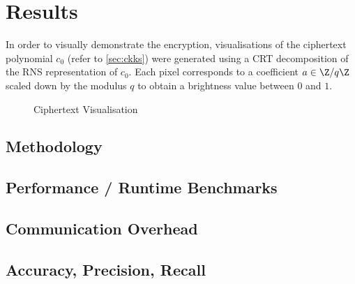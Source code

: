 \chapter{Results}
In order to visually demonstrate the encryption, visualisations of the ciphertext polynomial $c_0$ (refer to \autoref{sec:ckks}) were generated using a CRT decomposition of the RNS representation of $c_0$.
Each pixel corresponds to a coefficient $a \in \Z / q\Z$ scaled down by the modulus $q$ to obtain a brightness value between $0$ and $1$.

\begin{figure}[H]
  \centering
  \pgfplotsset{/pgfplots/group/.cd,vertical sep=0.3cm,horizontal sep=0.3cm}
  
  \caption{Ciphertext Visualisation}
\end{figure}

\section{Methodology}
\section{Performance / Runtime Benchmarks}
\section{Communication Overhead}
\section{Accuracy, Precision, Recall}
